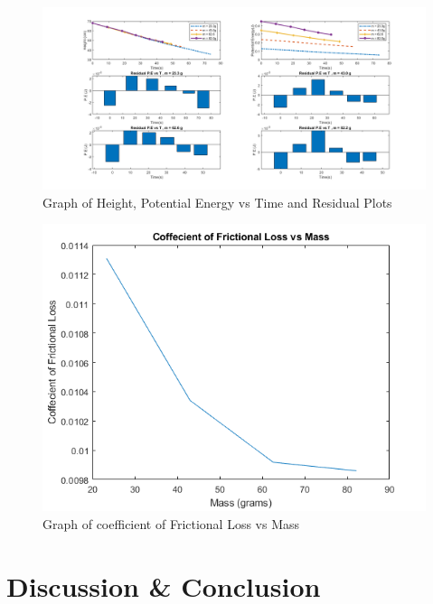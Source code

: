\begin{figure}[h!]
   \centering
    \includegraphics[width=1\textwidth]{figures/AllPlots.png}
    \caption{Graph of Height, Potential Energy vs Time and Residual Plots}
    \label{fig:yx}
\end{figure}



\newpage
\begin{figure}[h!]
   \centering
    \includegraphics[width=\textwidth]{figures/frictional.png}
    \caption{Graph of coefficient of Frictional Loss vs Mass}
    \label{fig:yx}
\end{figure}

\section{Discussion \& Conclusion}


